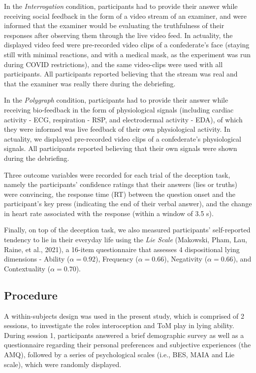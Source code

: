 \documentclass[
  man,mask,floatsintext]{apa6}
\begin{document}
In the \emph{Interrogation} condition, participants had to provide their answer while receiving social feedback in the form of a video stream of an examiner, and were informed that the examiner would be evaluating the truthfulness of their responses after observing them through the live video feed. In actuality, the displayed video feed were pre-recorded video clips of a confederate's face (staying still with minimal reactions, and with a medical mask, as the experiment was run during COVID restrictions), and the same video-clips were used with all participants. All participants reported believing that the stream was real and that the examiner was really there during the debriefing.

In the \emph{Polygraph} condition, participants had to provide their answer while receiving bio-feedback in the form of physiological signals (including cardiac activity - ECG, respiration - RSP, and electrodermal activity - EDA), of which they were informed was live feedback of their own physiological activity. In actuality, we displayed pre-recorded video clips of a confederate's physiological signals. All participants reported believing that their own signals were shown during the debriefing.

Three outcome variables were recorded for each trial of the deception task, namely the participants' confidence ratings that their answers (lies or truths) were convincing, the response time (RT) between the question onset and the participant's key press (indicating the end of their verbal answer), and the change in heart rate associated with the response (within a window of 3.5 s).

Finally, on top of the deception task, we also measured participants' self-reported tendency to lie in their everyday life using the \emph{Lie Scale} (Makowski, Pham, Lau, Raine, et al., 2021), a 16-item questionnaire that assesses 4 dispositional lying dimensions - Ability (\(\alpha = 0.92\)), Frequency (\(\alpha = 0.66\)), Negativity (\(\alpha = 0.66\)), and Contextuality (\(\alpha = 0.70\)).

\hypertarget{procedure}{%
\subsection{Procedure}\label{procedure}}

A within-subjects design was used in the present study, which is comprised of 2 sessions, to investigate the roles interoception and ToM play in lying ability. During session 1, participants answered a brief demographic survey as well as a questionnaire regarding their personal preferences and subjective experiences (the AMQ), followed by a series of psychological scales (i.e., BES, MAIA and Lie scale), which were randomly displayed.
\end{document}
